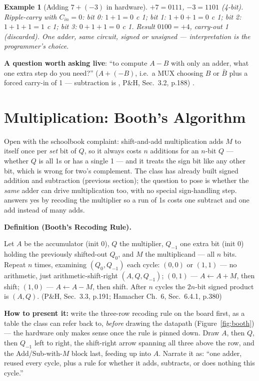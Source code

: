 \documentclass[11pt]{article}
\newtheorem{example}{Example}[section]
\newenvironment{definitionbox}[1]{%
  \par\noindent\textbf{Definition (#1).}\ \itshape
}{\par\vspace{0.3em}}
\begin{document}
\begin{example}[Adding $7 + (-3)$ in hardware]
$+7 = 0111$, $-3 = 1101$ (4-bit). Ripple-carry with $C_{in}=0$: bit 0: $1+1=0$ c 1; bit 1: $1+0+1=0$ c 1; bit 2: $1+1+1=1$ c 1; bit 3: $0+1+1=0$ c 1. Result $0100 = +4$, carry-out 1 (discarded). One adder, same circuit, signed or unsigned --- interpretation is the programmer's choice.
\end{example}

\textbf{A question worth asking live}: ``to compute $A-B$ with only an adder, what one extra step do you need?'' ($A + (-B)$, i.e.\ a MUX choosing $B$ or $\bar B$ plus a forced carry-in of 1 --- subtraction is , P\&H, Sec.~3.2, p.188) \cite{PattersonHennessy2017_computer_organization_design}.

\section{Multiplication: Booth's Algorithm}

Open with the schoolbook complaint: shift-and-add multiplication adds $M$ to itself once per \emph{set} bit of $Q$, so it always costs $n$ additions for an $n$-bit $Q$ --- whether $Q$ is all 1s or has a single 1 --- and it treats the sign bit like any other bit, which is wrong for two's complement. The class has already built signed addition and subtraction (previous section); the question to pose is whether the \emph{same} adder can drive multiplication too, with no special sign-handling step.  answers yes by recoding the multiplier so a run of 1s costs one subtract and one add instead of many adds.

\begin{definitionbox}{Booth's Recoding Rule}
Let $A$ be the accumulator (init 0), $Q$ the multiplier, $Q_{-1}$ one extra bit (init 0) holding the previously shifted-out $Q_0$, and $M$ the multiplicand --- all $n$ bits. Repeat $n$ times, examining $(Q_0,Q_{-1})$ each cycle: $(0,0)$ or $(1,1)$ --- no arithmetic, just arithmetic-shift-right $(A,Q,Q_{-1})$; $(0,1)$ --- $A \gets A+M$, then shift; $(1,0)$ --- $A \gets A-M$, then shift. After $n$ cycles the $2n$-bit signed product is $(A,Q)$. (P\&H, Sec.~3.3, p.191; Hamacher Ch.~6, Sec.~6.4.1, p.380) \cite{PattersonHennessy2017_computer_organization_design,Hamacher2002_computer_organization}
\end{definitionbox}

\textbf{How to present it:} write the three-row recoding rule on the board first, as a table the class can refer back to, \emph{before} drawing the datapath (Figure~\ref{fig:booth}) --- the hardware only makes sense once the rule is pinned down. Draw $A$, then $Q$, then $Q_{-1}$ left to right, the shift-right arrow spanning all three above the row, and the Add/Sub-with-$M$ block last, feeding up into $A$. Narrate it as: ``one adder, reused every cycle, plus a rule for whether it adds, subtracts, or does nothing this cycle.''
\end{document}
